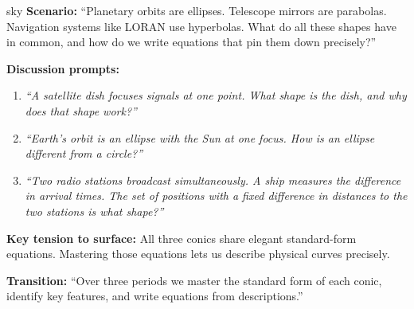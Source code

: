 \documentclass[10pt]{article}
\begin{document}
\begin{skillbox}{sky}
\textbf{Scenario:} ``Planetary orbits are ellipses. Telescope mirrors are
parabolas. Navigation systems like LORAN use hyperbolas. What do all these
shapes have in common, and how do we write equations that pin them down
precisely?''

\textbf{Discussion prompts:}
\begin{enumerate}[leftmargin=1.4em, itemsep=3pt]
  \item \textit{``A satellite dish focuses signals at one point. What shape is
    the dish, and why does that shape work?''}
  \item \textit{``Earth's orbit is an ellipse with the Sun at one focus. How
    is an ellipse different from a circle?''}
  \item \textit{``Two radio stations broadcast simultaneously. A ship measures
    the difference in arrival times. The set of positions with a fixed
    difference in distances to the two stations is what shape?''}
\end{enumerate}

\textbf{Key tension to surface:} All three conics share elegant standard-form
equations. Mastering those equations lets us describe physical curves precisely.

\textbf{Transition:} ``Over three periods we master the standard form of each
conic, identify key features, and write equations from descriptions.''
\end{skillbox}

\vspace{0.08in}
\end{document}
